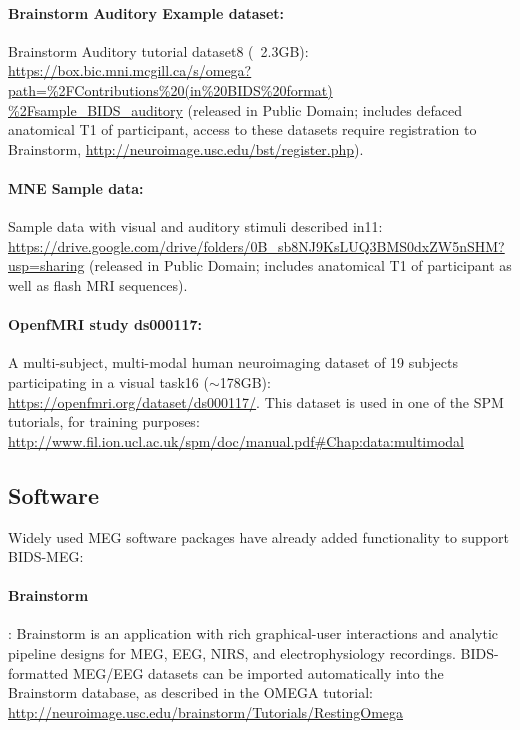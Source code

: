 \paragraph{Brainstorm Auditory Example dataset:} Brainstorm Auditory tutorial dataset8 (~2.3GB):
\url{https://box.bic.mni.mcgill.ca/s/omega?
path=\%2FContributions\%20(in\%20BIDS\%20format)
\%2Fsample_BIDS_auditory} (released in Public Domain; includes defaced anatomical T1 of participant, access to these datasets require registration to Brainstorm, \url{http://neuroimage.usc.edu/bst/register.php}). 

\paragraph{MNE Sample data:} Sample data with visual and auditory stimuli described in11:
\url{https://drive.google.com/drive/folders/0B_sb8NJ9KsLUQ3BMS0dxZW5nSHM?usp=sharing} (released in Public Domain; includes anatomical T1 of participant as well as flash MRI sequences). 

\paragraph{OpenfMRI study ds000117:} A multi-subject, multi-modal human neuroimaging dataset of 19 subjects participating in a visual task16 ($\sim$178GB): \url{https://openfmri.org/dataset/ds000117/}. This dataset is used in one of the SPM tutorials, for training purposes:
\url{http://www.fil.ion.ucl.ac.uk/spm/doc/manual.pdf#Chap:data:multimodal}

\subsection{Software}
Widely used MEG software packages have already added functionality to support BIDS-MEG:

\paragraph{Brainstorm}\citep{tadel2011brainstorm}: Brainstorm is an application with rich graphical-user interactions and analytic pipeline designs for MEG, EEG, NIRS, and electrophysiology recordings. BIDS-formatted MEG/EEG datasets can be imported automatically into the Brainstorm database, as described in the OMEGA tutorial: \url{http://neuroimage.usc.edu/brainstorm/Tutorials/RestingOmega}

